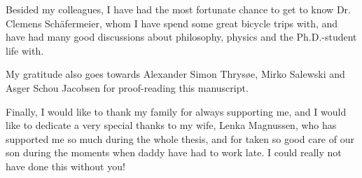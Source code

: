 Besided my colleagues, I have had the most fortunate chance to get to know Dr. Clemens Sch{\"a}fermeier, whom I have spend some great bicycle trips with, and have had many good discussions about philosophy, physics and the Ph.D.-student life with.

My gratitude also goes towards Alexander Simon Thrys{\o}e, Mirko Salewski and Asger Schou Jacobsen for proof-reading this manuscript.

Finally, I would like to thank my family for always supporting me, and I would like to dedicate a very special thanks to my wife, Lenka Magnussen, who has supported me so much during the whole thesis, and for taken so good care of our son during the moments when daddy have had to work late.
I could really not have done this without you!
